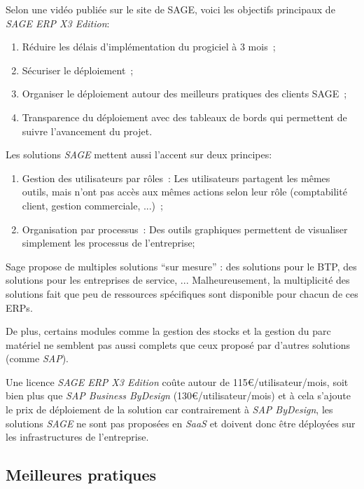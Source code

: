            Selon une vidéo publiée sur le site de SAGE, voici les objectifs principaux de \textit{SAGE ERP X3 Edition}:

            \begin{enumerate}
                \item Réduire les délais d'implémentation du progiciel à 3 mois~;
                \item Sécuriser le déploiement~;
                \item Organiser le déploiement autour des meilleurs pratiques des clients SAGE~;
                \item Transparence du déploiement avec des tableaux de bords qui permettent de suivre l'avancement du projet.
            \end{enumerate}

            Les solutions \textit{SAGE} mettent aussi l'accent sur deux principes:

            \begin{enumerate}
                \item Gestion des utilisateurs par rôles~: Les utilisateurs partagent les mêmes outils, mais n'ont pas accès aux mêmes actions selon leur rôle (comptabilité client, gestion commerciale, ...)~;
                \item Organisation par processus~: Des outils graphiques permettent de visualiser simplement les processus de l'entreprise;
            \end{enumerate}

            Sage propose de multiples solutions ``sur mesure'' : des solutions pour le BTP, des solutions pour les entreprises de service, ... Malheureusement, la multiplicité des solutions fait que peu de ressources spécifiques sont disponible pour chacun de ces ERPs.

            De plus, certains modules comme la gestion des stocks et la gestion du parc matériel ne semblent pas aussi complets que ceux proposé par d'autres solutions (comme \textit{SAP}).

            Une licence \textit{SAGE ERP X3 Edition} coûte autour de 115€/utilisateur/mois, soit bien plus que \textit{SAP Business ByDesign} (130€/utilisateur/mois) et à cela s'ajoute le prix de déploiement de la solution car contrairement à \textit{SAP ByDesign}, les solutions \textit{SAGE} ne sont pas proposées en \textit{SaaS} et doivent donc être déployées sur les infrastructures de l'entreprise.


    \subsection{Meilleures pratiques}

